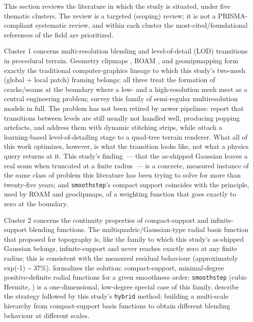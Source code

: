 This section reviews the literature in which the study is situated, under five thematic clusters. The review is a targeted (scoping) review; it is not a PRISMA-compliant systematic review, and within each cluster the most-cited/foundational references of the field are prioritized.

Cluster 1 concerns multi-resolution blending and level-of-detail (LOD) transitions in procedural terrain. Geometry clipmaps \citep{losasso2004}, ROAM \citep{duchaineau1997}, and geomipmapping \citep{deboer2000} form exactly the traditional computer-graphics lineage to which this study's two-mesh (global + local patch) framing belongs; all three treat the formation of cracks/seams at the boundary where a low- and a high-resolution mesh meet as a central engineering problem; \citet{pajarola2007} survey this family of semi-regular multiresolution models in full. The problem has not been retired by newer pipelines: \citet{zhang2019} report that transitions between levels are still usually not handled well, producing popping artefacts, and address them with dynamic stitching strips, while \citet{jain2024} attach a learning-based level-of-detailing stage to a quad-tree terrain renderer. What all of this work optimizes, however, is what the transition looks like, not what a physics query returns at it. This study's finding~--- that the as-shipped Gaussian leaves a real seam when truncated at a finite radius~--- is a concrete, measured instance of the same class of problem this literature has been trying to solve for more than twenty-five years; and \texttt{smoothstep}'s compact support coincides with the principle, used by ROAM and geoclipmaps, of a weighting function that goes exactly to zero at the boundary.

Cluster 2 concerns the continuity properties of compact-support and infinite-support blending functions. The multiquadric/Gaussian-type radial basis function that \citet{hardy1971} proposed for topography is, like the family to which this study's as-shipped Gaussian belongs, infinite-support and never reaches exactly zero at any finite radius; this is consistent with the measured residual behaviour (approximately exp(-1) \textasciitilde{} 37\%). \citet{wendland1995} formalizes the solution: compact-support, minimal-degree positive-definite radial functions for a given smoothness order; \texttt{smoothstep} (cubic Hermite, \citealp{ebert2002}) is a one-dimensional, low-degree special case of this family. \citet{ohtake2003} describe the strategy followed by this study's \texttt{hybrid} method: building a multi-scale hierarchy from compact-support basis functions to obtain different blending behaviour at different scales.


